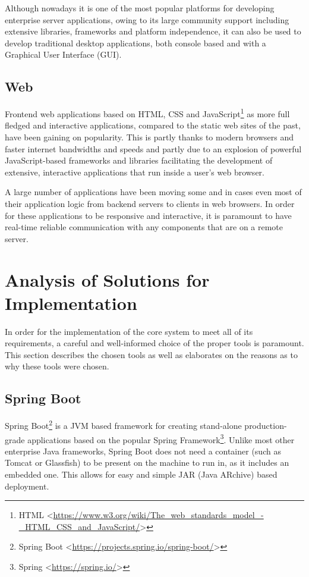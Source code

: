 Although nowadays it is one of the most popular platforms for developing enterprise server applications, owing to its large community support including extensive libraries, frameworks and platform independence, it can also be used to develop traditional desktop applications, both console based and with a Graphical User Interface (GUI).

\subsection{Web}
Frontend web applications based on HTML, CSS and JavaScript\footnote{HTML <\url{https://www.w3.org/wiki/The_web_standards_model_-_HTML_CSS_and_JavaScript/}>} as more full fledged and interactive applications, compared to the static web sites of the past, have been gaining on popularity. This is partly thanks to modern browsers and faster internet bandwidths and speeds and partly due to an explosion of powerful JavaScript-based frameworks and libraries facilitating the development of extensive, interactive applications that run inside a user's web browser.

A large number of applications have been moving some and in cases even most of their application logic from backend servers to clients in web browsers. In order for these applications to be responsive and interactive, it is paramount to have real-time reliable communication with any components that are on a remote server.

\section{Analysis of Solutions for Implementation}
In order for the implementation of the core system to meet all of its requirements, a careful and well-informed choice of the proper tools is paramount. This section describes the chosen tools as well as elaborates on the reasons as to why these tools were chosen.
\subsection{Spring Boot}
Spring Boot\footnote{Spring Boot <\url{https://projects.spring.io/spring-boot/}>} is a JVM based framework for creating stand-alone production-grade applications based on the popular Spring Framework\footnote{Spring <\url{https://spring.io/}>}. Unlike most other enterprise Java frameworks, Spring Boot does not need a container (such as Tomcat or Glassfish) to be present on the machine to run in, as it includes an embedded one. This allows for easy and simple JAR (Java ARchive) based deployment.

